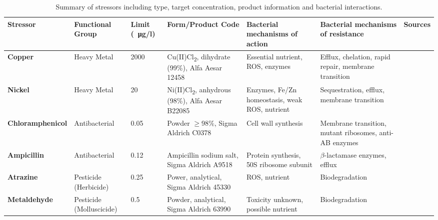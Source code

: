 \documentclass[10pt]{article}
\begin{document}
\begin{landscape}
\begin{table}[h]
\begin{threeparttable}
\caption{Summary of stressors including type, target concentration, product information and bacterial interactions.}
\small
\setlength{\tabcolsep}{4pt}
\setlength{\extrarowheight}{3pt}
\begin{tabular}{l M l K K K c}
\toprule
\textbf{Stressor} & \textbf{Functional Group} & \textbf{Limit (\SI{}{\ug}/l}) & \textbf{Form/Product Code} & \textbf{Bacterial mechanisms of action} & \textbf{Bacterial mechanisms of resistance} & \textbf{Sources} \\
\midrule
{}   \textbf{Copper} & Heavy Metal & 2000 & Cu(II)Cl\textsubscript{2}, dihydrate (99\%),                      Alfa Aesar 12458 & Essential nutrient, ROS, enzymes & Efflux, chelation, rapid repair,                            membrane transition & \cite{Nayar2004EnvironmentalMesocosms,Valko2005,Dupont2011,ECHA2018Cu} \\
                    \textbf{Nickel} & Heavy Metal & 20 & Ni(II)Cl\textsubscript{2}, anhydrous (98\%), Alfa Aesar B22085 & Enzymes, Fe/Zn homeostasis, weak ROS, nutrient & Sequestration, efflux, membrane transition & \cite{Nayar2004EnvironmentalMesocosms,Macomber2011,Nishimura1998,Zamble2015} \\

   \textbf{Chloramphenicol} & Antibacterial & 0.05 & Powder $\geqslant$98\%, Sigma                          Aldrich C0378 & Cell wall synthesis & Membrane transition, mutant ribosomes, anti-AB enzymes &                     \cite{Shaw1979,Rebstock1949,Toku-E2018Ch,Ruiz1999MechanismsFish} \\

                    \textbf{Ampicillin} & Antibacterial & 0.12 & Ampicillin sodium salt, Sigma Aldrich A9518 & Protein synthesis, 50S ribosome subunit & $\beta$-lactamase enzymes, efflux & \cite{Ruiz1999MechanismsFish,Costanzo2005} \\

   \textbf{Atrazine} & Pesticide (Herbicide) & 0.25 & Power, analytical, Sigma Aldrich                      45330 & ROS, nutrient & Biodegradation &                                                                          \cite{Shimabukuro1969,Delorenzo2001,Zhang2012} \\

                    \textbf{Metaldehyde} & Pesticide \break (Molluscicide) & 0.5 & Powder, analytical, Sigma Aldrich 63990 & Toxicity unknown, possible nutrient & Biodegradation & \cite{Kay2014,Castle2017,Thomas2017} \\


\end{tabular}
\end{threeparttable}
\end{table}
\end{landscape}
\end{document}
